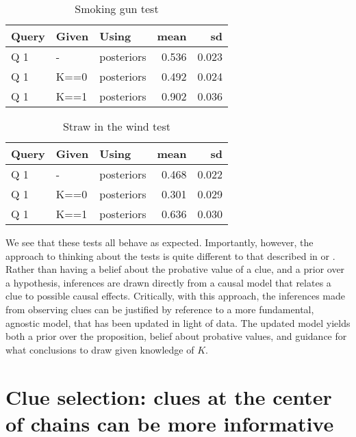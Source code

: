 \documentclass[
  12pt,
]{book}
\begin{document}
\begin{table}

\caption{\label{tab:unnamed-chunk-91}Smoking gun test}
\centering
\begin{tabular}[t]{l|l|l|r|r}
\hline
Query & Given & Using & mean & sd\\
\hline
Q 1 & - & posteriors & 0.536 & 0.023\\
\hline
Q 1 & K==0 & posteriors & 0.492 & 0.024\\
\hline
Q 1 & K==1 & posteriors & 0.902 & 0.036\\
\hline
\end{tabular}
\end{table}

\begin{table}

\caption{\label{tab:unnamed-chunk-91}Straw in the wind test}
\centering
\begin{tabular}[t]{l|l|l|r|r}
\hline
Query & Given & Using & mean & sd\\
\hline
Q 1 & - & posteriors & 0.468 & 0.022\\
\hline
Q 1 & K==0 & posteriors & 0.301 & 0.029\\
\hline
Q 1 & K==1 & posteriors & 0.636 & 0.030\\
\hline
\end{tabular}
\end{table}

We see that these tests all behave as expected. Importantly, however, the approach to thinking about the tests is quite different to that described in \citet{collier2011understanding} or \citet{humphreys2015mixing}. Rather than having a belief about the probative value of a clue, and a prior over a hypothesis, inferences are drawn directly from a causal model that relates a clue to possible causal effects. Critically, with this approach, the inferences made from observing clues can be justified by reference to a more fundamental, agnostic model, that has been updated in light of data. The updated model yields both a prior over the proposition, belief about probative values, and guidance for what conclusions to draw given knowledge of \(K\).

\hypertarget{clue-selection-clues-at-the-center-of-chains-can-be-more-informative}{%
\section{Clue selection: clues at the center of chains can be more informative}\label{clue-selection-clues-at-the-center-of-chains-can-be-more-informative}}
\end{document}
